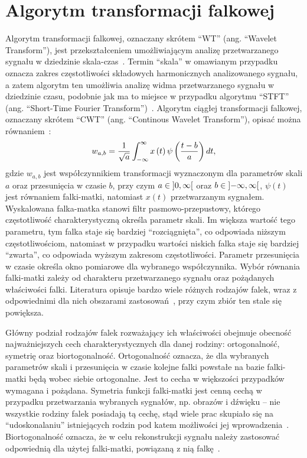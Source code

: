 \chapter{Algorytm transformacji falkowej}

Algorytm transformacji falkowej, oznaczany skrótem \enquote{WT} (ang. \enquote{Wavelet Transform}), jest przekształceniem umożliwiającym analizę przetwarzanego sygnału w dziedzinie skala-czas~\cite{wallen_handbook}. Termin \enquote{skala} w omawianym przypadku oznacza zakres częstotliwości składowych harmonicznych analizowanego sygnału, a zatem algorytm ten umożliwia analizę widma przetwarzanego sygnału w dziedzinie czasu, podobnie jak ma to miejsce w przypadku algorytmu \enquote{STFT} (ang. \enquote{Short-Time Fourier Transform})~\cite{durak_sftp}. Algorytm ciągłej transformacji falkowej, oznaczany skrótem \enquote{CWT} (ang. \enquote{Continous Wavelet Transform}), opisać można równaniem~\cite{wallen_handbook}:
\begin{equation}
w_{a,b} = \frac{1}{\sqrt{a}} \int _{-\infty} ^{\infty} x \left(t\right) \psi \left(\frac{t-b}{a}\right) dt \label{eq:cwt},
\end{equation}
gdzie $w_{a,b}$ jest współczynnikiem transformacji wyznaczonym dla parametrów skali $a$ oraz przesunięcia w czasie $b$, przy czym $a \in \ointerval{0}{\infty}$ oraz $b \in \ointerval{-\infty}{\infty}$, $\psi(t)$ jest równaniem falki-matki, natomiast $x(t)$ przetwarzanym sygnałem. Wyskalowana falka-matka stanowi filtr pasmowo-przepustowy, którego częstotliwość charakterystyczną określa parametr skali. Im większa wartość tego parametru, tym falka staje się bardziej \enquote{rozciągnięta}, co odpowiada niższym częstotliwościom, natomiast w przypadku wartości niskich falka staje się bardziej \enquote{zwarta}, co odpowiada wyższym zakresom częstotliwości. Parametr przesunięcia w czasie określa okno pomiarowe dla wybranego współczynnika. Wybór równania falki-matki zależy od charakteru przetwarzanego sygnału oraz pożądanych właściwości falki. Literatura opisuje bardzo wiele różnych rodzajów falek, wraz z odpowiednimi dla nich obszarami zastosowań~\cite{wallen_handbook, akujuobi_applications, lord_guide}, przy czym zbiór ten stale się powiększa.

Główny podział rodzajów falek rozważający ich właściwości obejmuje obecność najważniejszych cech charakterystycznych dla danej rodziny: ortogonalność, symetrię oraz biortogonalność. Ortogonalność oznacza, że dla wybranych parametrów skali i przesunięcia w czasie kolejne falki powstałe na bazie falki-matki będą wobec siebie ortogonalne. Jest to cecha w większości przypadków wymagana i pożądana. Symetria funkcji falki-matki jest cenną cechą w przypadku przetwarzania wybranych sygnałów, np. obrazów i dźwięku -- nie wszystkie rodziny falek posiadają tą cechę, stąd wiele prac skupiało się na \enquote{udoskonalaniu} istniejących rodzin pod katem możliwości jej wprowadzenia~\cite{reddy_compression}. Biortogonalność oznacza, że w celu rekonstrukcji sygnału należy zastosować odpowiednią dla użytej falki-matki, powiązaną z nią falkę~\cite{sweldens_bior}.

